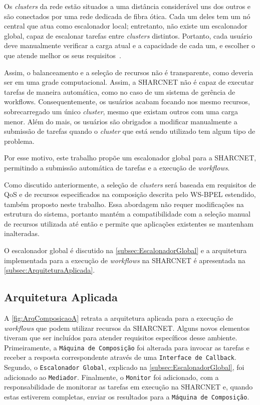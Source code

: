\documentclass[12pt]{report} %
\begin{document}
	    Os \textit{clusters} da rede estão situados a uma distância considerável uns dos outros e são conectados por uma rede dedicada de fibra ótica.
	    Cada um deles tem um nó central que atua como escalonador local; entretanto, não existe um escalonador global, capaz de escalonar tarefas entre \textit{clusters} distintos.
	    Portanto, cada usuário deve manualmente verificar a carga atual e a capacidade de cada um, e escolher o que atende melhor os seus requisitos~\cite{Chau03}.

	    Assim, o balanceamento e a seleção de recursos não é transparente, como deveria ser em uma grade computacional.
	    Assim, a SHARCNET não é capaz de executar tarefas de maneira automática, como no caso de um sistema de gerência de workflows.	     
	    Consequentemente, os usuários acabam focando nos mesmo recursos, sobrecarregado um único \textit{cluster}, mesmo que existam outros com uma carga menor.
	    Além do mais, os usuários são obrigados a modificar manualmente a submissão de tarefas quando o \textit{cluster} que está sendo utilizado tem algum tipo de problema.

	    Por esse motivo, este trabalho propõe um escalonador global para a SHARCNET, permitindo a submissão automática de tarefas e a execução de \textit{workflows}. 

	    Como discutido anteriormente, a seleção de \textit{clusters} será baseada em requisitos de QoS e de recursos especificados na composição descrita pelo WS-BPEL estendido, também proposto neste trabalho.
	    Essa abordagem não requer modificações na estrutura do sistema, portanto mantém a compatibilidade com a seleção manual de recursos utilizada até então e permite que aplicações existentes se mantenham inalteradas.	    
	    
	    O escalonador global é discutido na \autoref{subsec:EscalonadorGlobal} e a arquitetura implementada para a execução de \textit{workflows} na SHARCNET é apresentada na \autoref{subsec:ArquiteturaAplicada}.     	

	\subsection{Arquitetura Aplicada}	
	\label{subsec:ArquiteturaAplicada}
	    A \autoref{fig:ArqComposicaoA} retrata a arquitetura aplicada para a execução de \textit{workflows} que podem utilizar recursos da SHARCNET.
	    Alguns novos elementos tiveram que ser incluídos para atender requisitos específicos desse ambiente.
	    Primeiramente, a \texttt{Máquina de Composição} foi alterada para invocar as tarefas e receber a resposta correspondente através de uma \texttt{Interface de Callback}.
	    Segundo, o \texttt{Escalonador Global}, explicado na \autoref{subsec:EscalonadorGlobal}, foi adicionado ao \texttt{Mediador}.
	    Finalmente, o \texttt{Monitor} foi adicionado, com a responsabilidade de monitorar as tarefas em execução na SHARCNET e, quando estas estiverem completas, enviar os resultados para a \texttt{Máquina de Composição}.
	    
\end{document}

